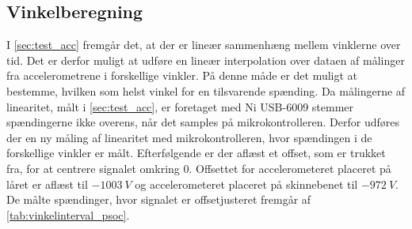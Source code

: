 \subsection{Vinkelberegning}\label{sec:imp_vinkler}
I \autoref{sec:test_acc} fremgår det, at der er lineær sammenhæng mellem vinklerne over tid. Det er derfor muligt at udføre en lineær interpolation over dataen af målinger fra accelerometrene i forskellige vinkler. På denne måde er det muligt at bestemme, hvilken som helst vinkel for en tilsvarende spænding. Da målingerne af linearitet, målt i \autoref{sec:test_acc}, er foretaget med Ni USB-6009 stemmer spændingerne ikke overens, når det samples på mikrokontrolleren. Derfor udføres der en ny måling af linearitet med mikrokontrolleren, hvor spændingen i de forskellige vinkler er målt. Efterfølgende er der aflæst et offset, som er trukket fra, for at centrere signalet omkring 0. Offsettet for accelerometeret placeret på låret er aflæst til $-1003~V$ og accelerometeret placeret på skinnebenet til $-972~V$. De målte spændinger, hvor signalet er offsetjusteret fremgår af \autoref{tab:vinkelinterval_psoc}.


